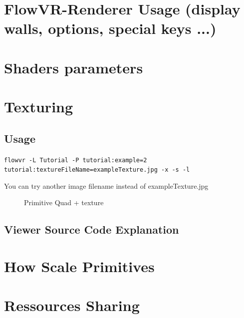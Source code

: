 \documentclass[a4paper,12pt,titlepage]{article}
\begin{document}
\section{FlowVR-Renderer Usage (display walls, options, special keys ...)}

\section{Shaders parameters}
\label{shaders}

\section{Texturing}
\label{texture}

\subsection{Usage}

\texttt{flowvr -L Tutorial -P tutorial:example=2 tutorial:textureFileName=exampleTexture.jpg -x -s -l}

You can try another image filename instead of exampleTexture.jpg

\begin{figure}[ht]
    \caption{Primitive Quad + texture}
\end{figure}

\subsection{Viewer Source Code Explanation}

\section{How Scale Primitives}
\label{scale}


\section{Ressources Sharing}
\label{ressources}
\end{document}
